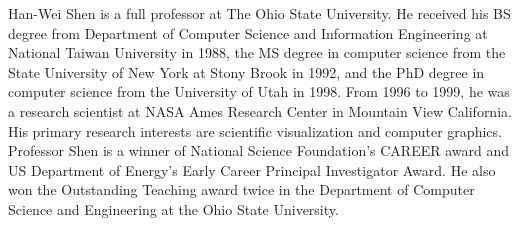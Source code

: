 \documentclass[preprint,journal]{vgtc}       %
\newcommand{\addverticalspace}{\vspace{3mm}}
\begin{document}
\addverticalspace
Han-Wei Shen is a full professor at The Ohio State University. He received his BS degree from Department of Computer Science and Information Engineering at National Taiwan University in 1988, the MS degree in computer science from the State University of New York at Stony Brook in 1992, and the PhD degree in computer science from the University of Utah in 1998. From 1996 to 1999, he was a research scientist at NASA Ames Research Center in Mountain View California. His primary research interests are scientific visualization and computer graphics. Professor Shen is a winner of National Science Foundation's CAREER award and US Department of Energy's Early Career Principal Investigator Award. He also won the Outstanding Teaching award twice in the Department of Computer Science and Engineering at the Ohio State University.

\printbibliography[title={Relevant Publications},category=Shen]

\addverticalspace



% 
% 
\end{document}
